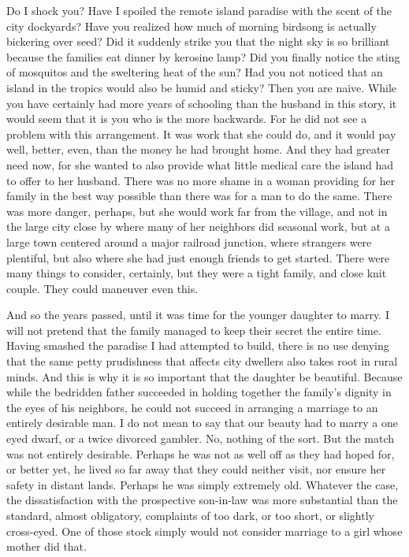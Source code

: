\documentclass{amsart}
\begin{document}
Do I shock you? Have I spoiled the remote island paradise with the scent of the city dockyards? Have you realized how much of morning birdsong is actually bickering over seed? Did it suddenly strike you that the night sky is so brilliant because the families eat dinner by kerosine lamp? Did you finally notice the sting of mosquitos and the sweltering heat of the sun? Had you not noticed that an island in the tropics would also be humid and sticky? Then you are naive. While you have certainly had more years of schooling than the husband in this story, it would seem that it is you who is the more backwards. For he did not see a problem with this arrangement. It was work that she could do, and it would pay well, better, even, than the money he had brought home. And they had greater need now, for she wanted to also provide what little medical care the island had to offer to her husband. There was no more shame in a woman providing for her family in the best way possible than there was for a man to do the same. There was more danger, perhaps, but she would work far from the village, and not in the large city close by where many of her neighbors did seasonal work, but at a large town centered around a major railroad junction, where strangers were plentiful, but also where she had just enough friends to get started. There were many things to consider, certainly, but they were a tight family, and close knit couple. They could maneuver even this. 

And so the years passed, until it was time for the younger daughter to marry. I will not pretend that the family managed to keep their secret the entire time. Having smashed the paradise I had attempted to build, there is no use denying that the same petty prudishness that affects city dwellers also takes root in rural minds. And this is why it is so important that the daughter be beautiful. Because while the bedridden father succeeded in holding together the family's dignity in the eyes of his neighbors, he could not succeed in arranging a marriage to an entirely desirable man. I do not mean to say that our beauty had to marry a one eyed dwarf, or a twice divorced gambler. No, nothing of the sort. But the match was not entirely desirable. Perhaps he was not as well off as they had hoped for, or better yet, he lived so far away that they could neither visit, nor ensure her safety in distant lands.  Perhaps he was simply extremely old. Whatever the case, the dissatisfaction with the prospective son-in-law was more substantial than the standard, almost obligatory, complaints of too dark, or too short, or slightly cross-eyed. One of those stock simply would not consider marriage to a girl whose mother did that.
\end{document}
